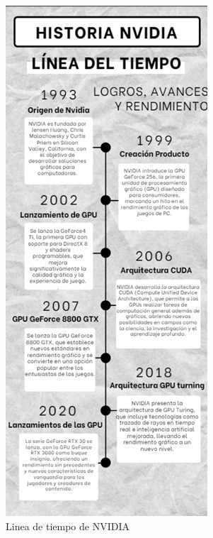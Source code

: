 \documentclass[conference]{IEEEtran}
\begin{document}
\begin{figure}[H]
	\begin{center}
		\includegraphics[width=\linewidth]{./Images/LineaTiempo.png}
		\caption{Linea de tiempo de NVIDIA}
	\end{center}
\end{figure}
\end{document}
